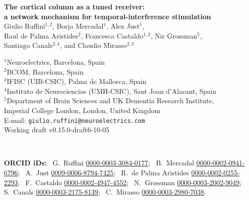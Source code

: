 \documentclass[11pt,a4paper]{article}
\newif\ifjne
\newcommand{\paperver}{0.15.0-draft6} %
\begin{document}
\ifjne
\begin{center}
{\LARGE\bfseries The cortical column as a tuned receiver:\\[4pt]
a network mechanism for temporal-interference stimulation}\\[16pt]
{\large Giulio Ruffini$^{1,2}$, Borja Mercadal$^{1}$, Alex Just$^{1}$,\\[2pt]
Raul de Palma Aristides$^{2}$, Francesca Castaldo$^{1,2}$, Nir Grossman$^{5}$,\\[2pt]
Santiago Canals$^{2,4}$, and Claudio Mirasso$^{2,3}$}\\[12pt]
\begin{minipage}{0.86\textwidth}\centering\small
$^{1}$Neuroelectrics, Barcelona, Spain\\
$^{2}$BCOM, Barcelona, Spain\\
$^{3}$IFISC (UIB-CSIC), Palma de Mallorca, Spain\\
$^{4}$Instituto de Neurociencias (UMH-CSIC), Sant Joan d'Alacant, Spain\\
$^{5}$Department of Brain Sciences and UK Dementia Research Institute,\\
Imperial College London, London, United Kingdom\\[6pt]
E-mail: \texttt{giulio.ruffini@neuroelectrics.com}\\[4pt]
Working draft v\paperver{}-10-05
\end{minipage}\\[8pt]
\begin{minipage}{0.86\textwidth}\centering\footnotesize\color{negray}
\textbf{ORCID iDs:}\ %
G.~Ruffini \href{https://orcid.org/0000-0003-3084-0177}{0000-0003-3084-0177};\ %
B.~Mercadal \href{https://orcid.org/0000-0002-0941-6796}{0000-0002-0941-6796};\ %
A.~Just \href{https://orcid.org/0009-0006-8794-7425}{0009-0006-8794-7425};\ %
R.~de Palma Aristides \href{https://orcid.org/0000-0002-0255-2293}{0000-0002-0255-2293};\ %
F.~Castaldo \href{https://orcid.org/0000-0002-4947-4552}{0000-0002-4947-4552};\ %
N.~Grossman \href{https://orcid.org/0000-0003-2002-9049}{0000-0003-2002-9049};\ %
S.~Canals \href{https://orcid.org/0000-0003-2175-8139}{0000-0003-2175-8139};\ %
C.~Mirasso \href{https://orcid.org/0000-0003-2980-7038}{0000-0003-2980-7038}.
\end{minipage}
\end{center}
\end{document}
